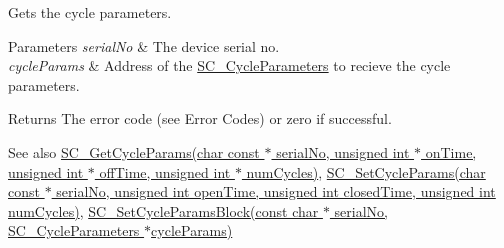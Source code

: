 Gets the cycle parameters. 


\begin{DoxyParams}{Parameters}
{\em serial\+No} & The device serial no. \\
\hline
{\em cycle\+Params} & Address of the \hyperlink{struct_s_c___cycle_parameters}{S\+C\+\_\+\+Cycle\+Parameters} to recieve the cycle parameters. \\
\hline
\end{DoxyParams}
\begin{DoxyReturn}{Returns}
The error code (see Error Codes) or zero if successful. 
\end{DoxyReturn}
\begin{DoxySeeAlso}{See also}
\hyperlink{group___t_cube_solenoid_gabe79b13a55e65c495360f10f8b808b59}{S\+C\+\_\+\+Get\+Cycle\+Params(char const $\ast$ serial\+No, unsigned int $\ast$ on\+Time, unsigned int $\ast$ off\+Time, unsigned int $\ast$ num\+Cycles)}, \hyperlink{group___t_cube_solenoid_ga4e947cf127cdc06d109666fb14a2b2ac}{S\+C\+\_\+\+Set\+Cycle\+Params(char const $\ast$ serial\+No, unsigned int open\+Time, unsigned int closed\+Time, unsigned int num\+Cycles)}, \hyperlink{group___t_cube_solenoid_ga4fbec26a6734f7d8af078d47ab8afc8a}{S\+C\+\_\+\+Set\+Cycle\+Params\+Block(const char $\ast$ serial\+No, S\+C\+\_\+\+Cycle\+Parameters $\ast$cycle\+Params)}


\end{DoxySeeAlso}
